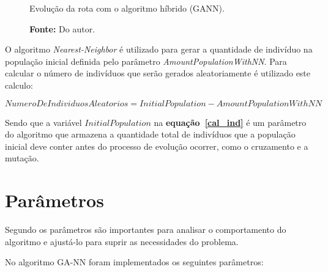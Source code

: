 \documentclass[12pt,openright,a4paper,twoside]{tcc}
\begin{document}
		\begin{figure}[h]
			\centering
            \caption{Evolução da rota com o algoritmo híbrido (GANN).}
			\caption*{\textbf{Fonte:} Do autor.}
			\label{figagnn}
		\end{figure}


		O algoritmo \textit{Nearest-Neighbor} é utilizado para gerar a quantidade de indivíduo na população inicial definida pelo parâmetro \textit{AmountPopulationWithNN}. Para calcular o número de indivíduos que serão gerados aleatoriamente é utilizado este calculo:

			\begin{equation}
				\label{cal_ind}
		 		NumeroDeIndividuosAleatorios = InitialPopulation - AmountPopulationWithNN 
		 	\end{equation} 
		
		Sendo que a variável $InitialPopulation$ na \textbf{equação~\ref{cal_ind}} é um parâmetro do algoritmo que armazena a quantidade total de indivíduos que a população inicial deve conter antes do processo de evolução ocorrer, como o cruzamento e a mutação.

        \section{Parâmetros}
        
        Segundo  os parâmetros são importantes para analisar o comportamento do algoritmo e ajustá-lo para suprir as necessidades do problema. 
        
        No algoritmo GA-NN foram implementados os seguintes parâmetros:
         
\end{document}
